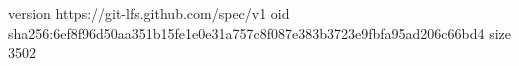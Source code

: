 version https://git-lfs.github.com/spec/v1
oid sha256:6ef8f96d50aa351b15fe1e0e31a757c8f087e383b3723e9fbfa95ad206c66bd4
size 3502
